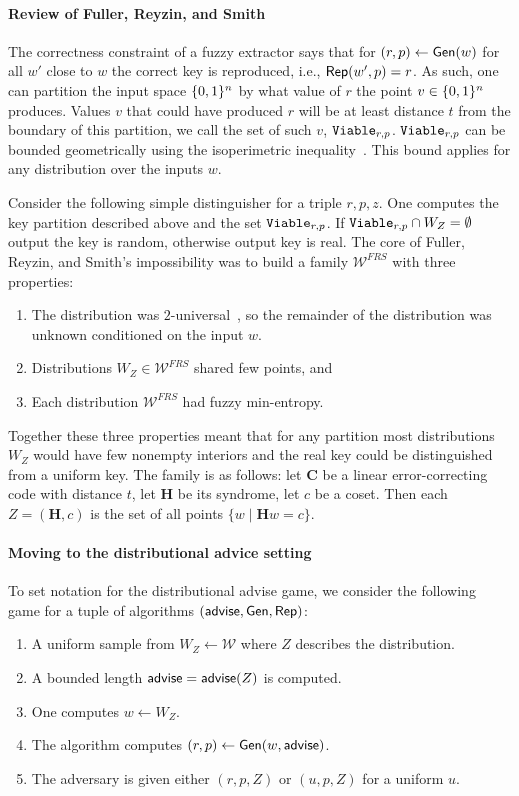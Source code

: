 \paragraph{Review of Fuller, Reyzin, and Smith~\cite{fuller2020fuzzy}}
The correctness constraint of a fuzzy extractor says that for $(r, p)\leftarrow {\ensuremath{\mathsf{Gen}}}(w)$ for all $w'$ close to $w$ the correct key is reproduced, i.e., ${\mathsf{Rep}}(w', p)=r$.  As such, one can partition the input space $\{0, 1\}^n$ by what value of $r$ the point  $v\in \{0, 1\}^n$ produces.  Values $v$ that could have produced  $r$ will be at least distance $t$ from the boundary of this partition, we call the set of such $v$, $\mathtt{Viable}_{r,p}$.  $\mathtt{Viable}_{r,p}$ can be bounded geometrically using the isoperimetric inequality~\cite{harper1966optimal}.  This bound applies for any distribution over the inputs $w$.

Consider the following simple distinguisher for a triple $r, p, z$.  One computes the key partition described above and the set $\mathtt{Viable}_{r,p}$. If $\mathtt{Viable}_{r,p} \cap W_Z =\emptyset$ output the key is random, otherwise output key is real. 
The core of Fuller, Reyzin, and Smith's impossibility was to build a family $\mathcal{W}^{FRS}$ with three properties:
\begin{enumerate}
\item The distribution was $2$-universal~\cite{carter1977universal}, so the remainder of the distribution was unknown conditioned on the input $w$. 
\item Distributions $W_Z \in \mathcal{W}^{FRS}$ shared few points, and 
\item Each distribution $\mathcal{W}^{FRS}$ had fuzzy min-entropy.
\end{enumerate}
Together these three properties meant that for any partition most distributions $W_Z$ would have few nonempty interiors and the real key could be distinguished from a uniform key.  
The family is as follows: let $\mathbf{C}$ be a linear error-correcting code with distance $t$, let $\mathbf{H}$ be its syndrome, let $c$ be a coset.  Then each $Z = (\mathbf{H}, c)$ is the set of all points $\{w \mid \mathbf{H} w = c\}$.

\paragraph{Moving to the distributional advice setting}
To set notation for the distributional advise game, we consider the following game for a tuple of algorithms $({\mathsf{advise}}, {\mathsf{Gen}}, {\mathsf{Rep}})$:
\begin{enumerate}
\itemsep0em
\item A uniform sample from $W_Z \leftarrow \mathcal{W}$ where $Z$ describes the distribution. 
\item A bounded length ${\mathsf{advise}} = {\mathsf{advise}}(Z)$ is computed.
\item One computes $w\leftarrow W_Z$.
\item The algorithm computes $(r, p)\leftarrow {\ensuremath{\mathsf{Gen}}}(w, {\mathsf{advise}})$.
\item The adversary is given either $(r, p, Z)$ or $(u, p, Z)$ for a uniform $u$. 
\end{enumerate}

